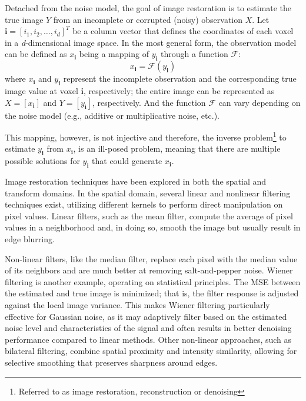Detached from the noise model, the goal of image restoration is to estimate the true image $Y$ from an incomplete or corrupted (noisy) observation $X$. Let $\mathbf{i} = [i_1, i_2, \dots, i_d]^T$ be a column vector that defines the coordinates of each voxel in a \textit{d}-dimensional image space. In the most general form, the observation model can be defined as $x_{\mathbf{i}}$ being a mapping of $y_{\mathbf{i}}$ through a function $\mathcal{F}$:
\begin{equation}\label{eq:observation-model}
    x_{\mathbf{i}} = \mathcal{F} (y_{\mathbf{i}})
\end{equation}
where $x_{\mathbf{i}}$ and $y_{\mathbf{i}}$ represent the incomplete observation and the corresponding true image value at voxel $\mathbf{i}$, respectively; the entire image can be represented as $X = [x_{\mathbf{i}}]$ and $Y = [y_{\mathbf{i}}]$, respectively. And the function $\mathcal{F}$ can vary depending on the noise model (e.g., additive or multiplicative noise, etc.).

This mapping, however, is not injective and therefore, the inverse problem\footnote{Referred to as image restoration, reconstruction or denoising} to estimate $y_{\mathbf{i}}$ from $x_{\mathbf{i}}$, is an ill-posed problem, meaning that there are multiple possible solutions for $y_{\mathbf{i}}$ that could generate $x_{\mathbf{i}}$.

Image restoration techniques have been explored in both the spatial and transform domains. In the spatial domain, several linear and nonlinear filtering techniques exist, utilizing different kernels to perform direct manipulation on pixel values. Linear filters, such as the mean filter, compute the average of pixel values in a neighborhood and, in doing so, smooth the image but usually result in edge blurring.

Non-linear filters, like the median filter, replace each pixel with the median value of its neighbors and are much better at removing salt-and-pepper noise. Wiener filtering is another example, operating on statistical principles. The \gls{MSE} between the estimated and true image is minimized; that is, the filter response is adjusted against the local image variance. This makes Wiener filtering particularly effective for Gaussian noise, as it may adaptively filter based on the estimated noise level and characteristics of the signal and often results in better denoising performance compared to linear methods. Other non-linear approaches, such as bilateral filtering, combine spatial proximity and intensity similarity, allowing for selective smoothing that  preserves sharpness around edges. 

